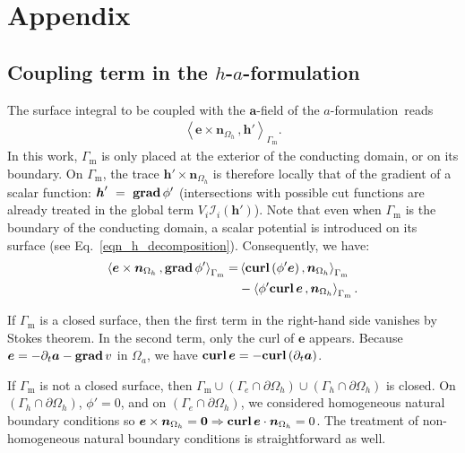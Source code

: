 \documentclass[journal]{IEEEtran}
\renewcommand{\vec}[1]{\boldsymbol{#1}} %
\newcommand{\parenangle}[1]{\left\langle#1\right\rangle}
\newcommand{\surInt}[3]{\parenangle{#1 \, , #2}_{#3}}
\newcommand{\grad}{\text{\textbf{grad}}\, }
\newcommand{\curl}{\text{\textbf{curl}}\, }
\renewcommand{\a}{\vec a}
\newcommand{\n}{\vec n}
\newcommand{\h}{\vec h}
\newcommand{\e}{\vec e}
\newcommand{\dt}{\partial_t}
\newcommand{\Oa}{\Omega_a}
\newcommand{\Oh}{\Omega_h}
\newcommand{\Gm}{\Gamma_\text{m}}
\newcommand{\af}{$a$-formulation\ }
\newcommand{\haf}{$h$-$a$-formulation\ }
\begin{document}
\section*{Appendix}

\subsection{Coupling term in the \haf}

The surface integral to be coupled with the $\a$-field of the \af reads
\begin{align}
\surInt{\e \times \n_{\Oh}}{\h'}{\Gm}.
\end{align}
In this work, $\Gm$ is only placed at the exterior of the conducting domain, or on its boundary. On $\Gm$, the trace $\h'\times \n_{\Oh}$ is therefore locally that of the gradient of a scalar function: $\h'~=~\grad \phi'$ (intersections with possible cut functions are already treated in the global term $V_i \mathcal{I}_i(\h')$). Note that even when $\Gm$ is the boundary of the conducting domain, a scalar potential is introduced on its surface (see Eq.~\eqref{eqn_h_decomposition}). Consequently, we have:
\begin{align}
\surInt{\e \times \n_{\Oh}}{\grad \phi'}{\Gm} =& \surInt{\curl (\phi' \e)}{ \n_{\Oh}}{\Gm} \notag\\
& - \surInt{\phi' \curl\e}{ \n_{\Oh}}{\Gm} .
\end{align}

If $\Gm$ is a closed surface, then the first term in the right-hand side vanishes by Stokes theorem. In the second term, only the curl of $\e$ appears. Because $\e = -\dt \a - \grad v$ in $\Oa$, we have $\curl \e = -\curl (\dt \a)$.

If $\Gm$ is not a closed surface, then $\Gm \cup (\Gamma_e \cap \partial \Oh)\cup (\Gamma_h \cap \partial \Oh)$ is closed. On $(\Gamma_h \cap \partial \Oh)$, $\phi' = 0$, and on $(\Gamma_e \cap \partial \Oh)$, we considered homogeneous natural boundary conditions so $\e\times \n_{\Oh} = \vec 0\Rightarrow \curl \e \cdot \n_{\Oh}=0$. The treatment of non-homogeneous natural boundary conditions is straightforward as well.
\end{document}
